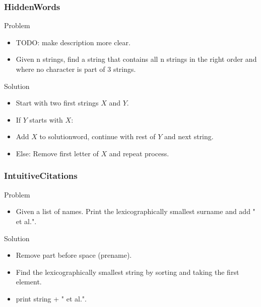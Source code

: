 \documentclass{beamer}
\begin{document}
\begin{frame}
    \frametitle{HiddenWords}
    \begin{block}{Problem}
        \begin{itemize}
            \item TODO: make description more clear.
            \item Given n strings, find a string that contains all n strings in the right order and where no character is part of 3 strings.
        \end{itemize}
    \end{block}
    \begin{block}{Solution}
        \begin{itemize}
            \item Start with two first strings $X$ and $Y$.
            \item If $Y$ starts with $X$:
            \item Add $X$ to solutionword, continue with rest of $Y$ and next string.
            \item Else: Remove first letter of $X$ and repeat process.
        \end{itemize}
    \end{block}
\end{frame}

\begin{frame}
    \frametitle{IntuitiveCitations}
    \begin{block}{Problem}
        \begin{itemize}
            \item Given a list of names. Print the lexicographically smallest surname and add " et al.".
        \end{itemize}
    \end{block}
    \begin{block}{Solution}
        \begin{itemize}
            \item Remove part before space (prename).
            \item Find the lexicographically smallest string by sorting and taking the first element.
            \item print string + " et al.".
        \end{itemize}
    \end{block}
\end{frame}
\end{document}
